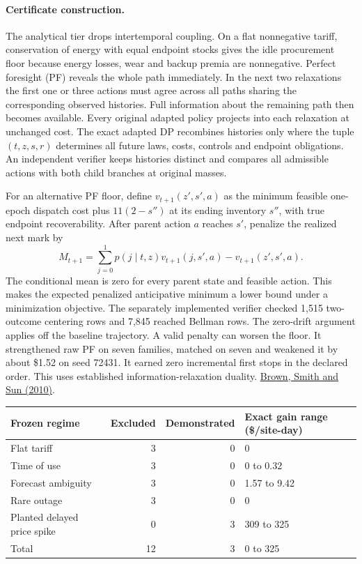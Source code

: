 \documentclass[11pt,letterpaper]{article}
\begin{document}
\paragraph{Certificate construction.}
The analytical tier drops intertemporal coupling. On a flat nonnegative tariff, conservation of energy with equal endpoint stocks gives the idle procurement floor because energy losses, wear and backup premia are nonnegative. Perfect foresight (PF) reveals the whole path immediately. In the next two relaxations the first one or three actions must agree across all paths sharing the corresponding observed histories. Full information about the remaining path then becomes available. Every original adapted policy projects into each relaxation at unchanged cost. The exact adapted DP recombines histories only where the tuple $(t,z,s,r)$ determines all future laws, costs, controls and endpoint obligations. An independent verifier keeps histories distinct and compares all admissible actions with both child branches at original masses.

For an alternative PF floor, define $v_{t+1}(z',s',a)$ as the minimum feasible one-epoch dispatch cost plus $11(2-s'')$ at its ending inventory $s''$, with true endpoint recoverability. After parent action $a$ reaches $s'$, penalize the realized next mark by
\[
 M_{t+1}=\sum_{j=0}^1 p(j\mid t,z)v_{t+1}(j,s',a)-v_{t+1}(z',s',a).
\]
The conditional mean is zero for every parent state and feasible action. This makes the expected penalized anticipative minimum a lower bound under a minimization objective. The separately implemented verifier checked 1,515 two-outcome centering rows and 7,845 reached Bellman rows. The zero-drift argument applies off the baseline trajectory. A valid penalty can worsen the floor. It strengthened raw PF on seven families, matched on seven and weakened it by about \$1.52 on seed 72431. It earned zero incremental first stops in the declared order. This uses established information-relaxation duality. \href{https://doi.org/10.1287/opre.1090.0796}{Brown, Smith and Sun (2010)}.

\begin{center}
\begin{tabular}{lrrl}
\hline
Frozen regime & Excluded & Demonstrated & Exact gain range (\$/site-day)\\
\hline
Flat tariff &3&0&0\\
Time of use &3&0&0 to 0.32\\
Forecast ambiguity &3&0&1.57 to 9.42\\
Rare outage &3&0&0\\
Planted delayed price spike &0&3&309 to 325\\
\hline
Total &12&3&0 to 325\\
\hline
\end{tabular}
\end{center}
\end{document}
